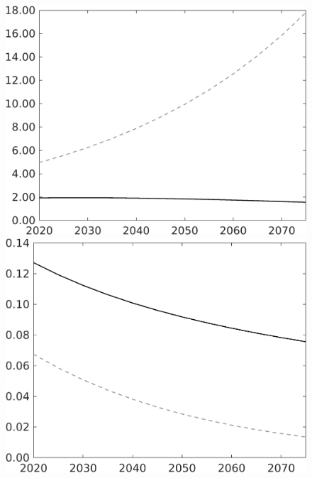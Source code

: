 \documentclass[12pt]{article}
\begin{document}
\begin{figure}[h!!]
\begin{minipage}[]{0.32\textwidth}
	\end{minipage}	
	\begin{minipage}[]{0.32\textwidth}
		\includegraphics[width=1\textwidth]{../../codding_model/own_basedOnFried/optimalPol_010922_revision/figures/all_13Sept22/LevTaufNoTauf_TaulCalib_regime0_pgpftf_spillover0_nsk1_xgr1_knspil1_sep1_LFlimit0_emsbase0_countec0_GovRev0_etaa0.79_lgd0.png}
	\end{minipage}	
	\begin{minipage}[]{0.32\textwidth}
		\includegraphics[width=1\textwidth]{../../codding_model/own_basedOnFried/optimalPol_010922_revision/figures/all_13Sept22/LevTaufNoTauf_TaulCalib_regime0_pepn_spillover0_nsk1_xgr1_knspil1_sep1_LFlimit0_emsbase0_countec0_GovRev0_etaa0.79_lgd0.png}

\end{minipage}
\end{figure}
\end{document}

